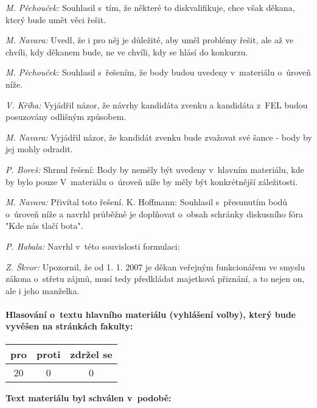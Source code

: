 \documentclass[a4paper,12pt,notitlepage,oneside]{article}
\newcommand{\hlasovani}[3]{\begin{center}
\begin{tabular}{|c|c|c|}\hline
pro& proti & zdržel se \\ \hline
#1 & #2 & #3 \\ \hline
\end{tabular}
\end{center}}
\begin{document}
\textit{M. Pěchouček:} Souhlasil s~tím, že některé to diskvalifikuje, chce však děkana, který bude umět věci řešit.

\textit{M. Navara:} Uvedl, že i pro něj je důležité, aby uměl problémy řešit, ale až ve chvíli, kdy děkanem bude, ne ve chvíli, kdy se hlásí do konkurzu.

\textit{M. Pěchouček:}  Souhlasil s~řešením, že body budou uvedeny v~materiálu o~úroveň níže.

\textit{V. Kříha:} Vyjádřil názor, že návrhy kandidáta zvenku a kandidáta z~FEL budou posuzovány odlišným způsobem.

\textit{M. Navara:} Vyjádřil názor, že kandidát zvenku bude zvažovat své šance - body by jej mohly odradit.

\textit{P. Boreš:} Shrnul řešení: Body by neměly být uvedeny v~hlavním materiálu, kde by bylo pouze  V~materiálu o~úroveň níže by měly být konkrétnější záležitosti.

\textit{M. Navara:} Přivítal toto řešení.
K. Hoffmann: Souhlasil s~přesunutím bodů o~úroveň níže a navrhl průběžně je doplňovat o~obsah schránky diskusního fóra "Kde nás tlačí bota".

\textit{P. Habala:} Navrhl v~této souvislosti formulaci: 

\textit{Z. Škvor:} Upozornil, že od 1. 1. 2007 je děkan veřejným funkcionářem ve smyslu zákona o~střetu zájmů, musí tedy předkládat majetková přiznání, a to nejen on, ale i jeho manželka.

\paragraph{Hlasování o~textu hlavního materiálu (vyhlášení volby), který bude vyvěšen na stránkách fakulty:}
\hlasovani{20}{0}{0}


\textbf{Text materiálu byl schválen v~podobě:}\\
\end{document}

